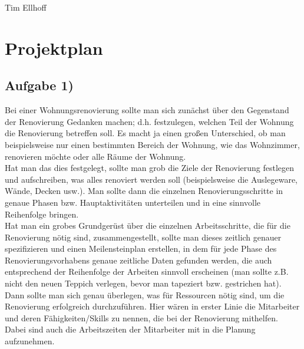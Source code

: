 \documentclass{swp1}
\begin{document}
          {Tim Ellhoff}{}{}
          
\section*{Projektplan}          
\subsection*{Aufgabe 1)}
Bei einer Wohnungsrenovierung sollte man sich zunächst über den Gegenstand der Renovierung Gedanken machen; d.h. festzulegen, welchen Teil der Wohnung die Renovierung betreffen soll. Es macht ja einen großen Unterschied, ob man beispielsweise nur einen bestimmten Bereich der Wohnung, wie das Wohnzimmer, renovieren möchte oder alle Räume der Wohnung. \\
Hat man das dies festgelegt, sollte man grob die Ziele der Renovierung festlegen und aufschreiben, was alles renoviert werden soll (beispielsweise die Auslegeware, Wände, Decken usw.).
Man sollte dann die einzelnen Renovierungsschritte in genaue Phasen bzw. Hauptaktivitäten unterteilen und in eine sinnvolle Reihenfolge bringen.\\
Hat man ein grobes Grundgerüst über die einzelnen Arbeitsschritte, die für die Renovierung nötig sind, zusammengestellt, sollte man dieses zeitlich genauer spezifizieren und einen Meilensteinplan erstellen, in dem für jede Phase des Renovierungsvorhabens genaue zeitliche Daten gefunden werden, die auch entsprechend der Reihenfolge der Arbeiten sinnvoll erscheinen (man sollte z.B. nicht den neuen Teppich verlegen, bevor man tapeziert bzw. gestrichen hat). \\

Dann sollte man sich genau überlegen, was für Ressourcen nötig sind, um die Renovierung erfolgreich durchzuführen. Hier wären in erster Linie die Mitarbeiter und deren Fähigkeiten/Skills zu nennen, die bei der Renovierung mithelfen. Dabei sind auch die Arbeitszeiten der Mitarbeiter mit in die Planung aufzunehmen. \\
\end{document}
